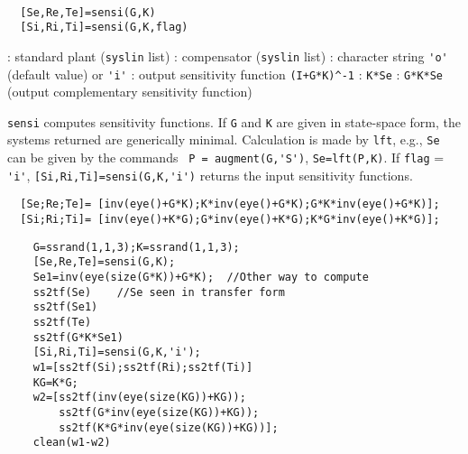 \begin{mandesc}
   \\ %
\end{mandesc}
\begin{calling_sequence}
\begin{verbatim}
  [Se,Re,Te]=sensi(G,K)  
  [Si,Ri,Ti]=sensi(G,K,flag)  
\end{verbatim}
\end{calling_sequence}
\begin{parameters}
  \begin{varlist}
    : standard plant (\verb!syslin! list)
    : compensator (\verb!syslin! list)
    : character string \verb!'o'! (default value) or \verb!'i'!
    : output sensitivity function \verb!(I+G*K)^-1!
    : \verb!K*Se!
    : \verb!G*K*Se! (output complementary sensitivity function)
  \end{varlist}
\end{parameters}
\begin{mandescription}
  \verb!sensi! computes sensitivity functions. If \verb!G! and \verb!K! are
  given in state-space form, the systems returned are generically minimal. 
  Calculation is made by \verb!lft!, e.g., 
  \verb!Se! can be given by the commands 
  \verb! P = augment(G,'S')!, \verb!Se=lft(P,K)!.
  If \verb!flag! = \verb!'i'!, \verb![Si,Ri,Ti]=sensi(G,K,'i')!
  returns the input sensitivity functions.
\begin{verbatim}
  [Se;Re;Te]= [inv(eye()+G*K);K*inv(eye()+G*K);G*K*inv(eye()+G*K)];
  [Si;Ri;Ti]= [inv(eye()+K*G);G*inv(eye()+K*G);K*G*inv(eye()+K*G)];
\end{verbatim}
\end{mandescription}
\begin{examples}
  \begin{Verbatim}
    G=ssrand(1,1,3);K=ssrand(1,1,3);
    [Se,Re,Te]=sensi(G,K);
    Se1=inv(eye(size(G*K))+G*K);  //Other way to compute
    ss2tf(Se)    //Se seen in transfer form
    ss2tf(Se1)
    ss2tf(Te)
    ss2tf(G*K*Se1)
    [Si,Ri,Ti]=sensi(G,K,'i');
    w1=[ss2tf(Si);ss2tf(Ri);ss2tf(Ti)]
    KG=K*G;
    w2=[ss2tf(inv(eye(size(KG))+KG));
        ss2tf(G*inv(eye(size(KG))+KG));
        ss2tf(K*G*inv(eye(size(KG))+KG))];
    clean(w1-w2)
  \end{Verbatim}
\end{examples}
\begin{manseealso}
      
\end{manseealso}
